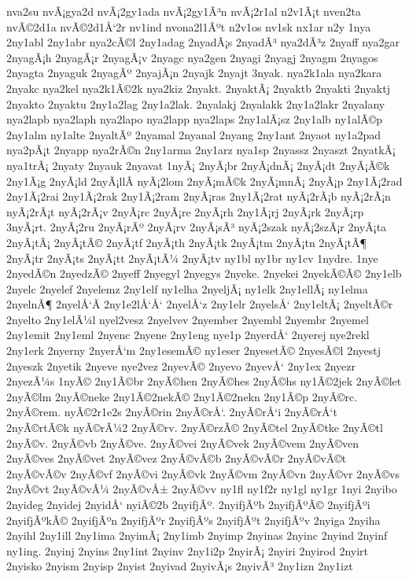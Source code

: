 {nva2su
nvÃ¡gya2d
nvÃ¡2gy1ada
nvÃ¡2gy1Ã³n
nvÃ¡2r1al
n2v1Ã¡t
nven2ta
nvÃ©2d1a
nvÃ©2d1Å‘2r
nv1ind
nvona2l1Ãºt
n2v1os
nv1sk
nx1ar
n2y
1nya
2ny1abl
2ny1abr
nya2cÃ©l
2ny1adag
2nyadÃ¡s
2nyadÃ³
nya2dÃ³z
2nyaff
nya2gar
2nyagÃ¡h
2nyagÃ¡r
2nyagÃ¡v
2nyagc
nya2gen
2nyagi
2nyagj
2nyagm
2nyagos
2nyagta
2nyaguk
2nyagÃº
2nyajÃ¡n
2nyajk
2nyajt
3nyak.
nya2k1ala
nya2kara
2nyakc
nya2kel
nya2k1Ã©2k
nya2kiz
2nyakt.
2nyaktÃ¡
2nyaktb
2nyakti
2nyaktj
2nyakto
2nyaktu
2ny1a2lag
2ny1a2lak.
2nyalakj
2nyalakk
2ny1a2lakr
2nyalany
nya2lapb
nya2laph
nya2lapo
nya2lapp
nya2laps
2ny1alÃ¡sz
2ny1alb
ny1alÃ©p
2ny1alm
ny1alte
2nyaltÃº
2nyamal
2nyanal
2nyang
2ny1ant
2nyaot
ny1a2pad
nya2pÃ¡t
2nyapp
nya2rÃ©n
2ny1arma
2ny1arz
nya1sp
2nyassz
2nyaszt
2nyatkÃ¡
nya1trÃ¡
2nyaty
2nyauk
2nyavat
1nyÃ¡
2nyÃ¡br
2nyÃ¡dnÃ¡
2nyÃ¡dt
2nyÃ¡Ã©k
2ny1Ã¡g
2nyÃ¡ld
2nyÃ¡llÃ­
nyÃ¡2lom
2nyÃ¡mÃ©k
2nyÃ¡mnÃ¡
2nyÃ¡p
2ny1Ã¡2rad
2ny1Ã¡2rai
2ny1Ã¡2rak
2ny1Ã¡2ram
2nyÃ¡ras
2ny1Ã¡2rat
nyÃ¡2rÃ¡b
nyÃ¡2rÃ¡n
nyÃ¡2rÃ¡t
nyÃ¡2rÃ¡v
2nyÃ¡rc
2nyÃ¡re
2nyÃ¡rh
2ny1Ã¡rj
2nyÃ¡rk
2nyÃ¡rp
3nyÃ¡rt.
2nyÃ¡2ru
2nyÃ¡rÃº
2nyÃ¡rv
2nyÃ¡sÃ³
nyÃ¡2szak
nyÃ¡2szÃ¡r
2nyÃ¡ta
2nyÃ¡tÃ¡
2nyÃ¡tÃ©
2nyÃ¡tf
2nyÃ¡th
2nyÃ¡tk
2nyÃ¡tm
2nyÃ¡tn
2nyÃ¡tÃ¶
2nyÃ¡tr
2nyÃ¡ts
2nyÃ¡tt
2nyÃ¡tÃ¼
2nyÃ¡tv
ny1bl
ny1br
ny1cv
1nydre.
1nye
2nyedÃ©n
2nyedzÃ©
2nyeff
2nyegyl
2nyegys
2nyeke.
2nyekei
2nyekÃ©Ã©
2ny1elb
2nyelc
2nyelef
2nyelemz
2ny1elf
ny1elha
2nyeljÃ¡
ny1elk
2ny1ellÃ¡
ny1elma
2nyelnÃ¶
2nyelÅ‘Ã­
2ny1e2lÅ‘Å‘
2nyelÅ‘z
2ny1elr
2nyelsÅ‘
2ny1eltÃ¡
2nyeltÃ©r
2nyelto
2ny1elÃ¼l
nyel2vesz
2nyelvev
2nyember
2nyembl
2nyembr
2nyemel
2ny1emit
2ny1eml
2nyenc
2nyene
2ny1eng
nye1p
2nyerdÅ‘
2nyerej
nye2rekl
2ny1erk
2nyerny
2nyerÅ‘m
2ny1esemÃ©
ny1eser
2nyesetÃ©
2nyesÃ©l
2nyestj
2nyeszk
2nyetik
2nyeve
nye2vez
2nyevÃ©
2nyevo
2nyevÅ‘
2ny1ex
2nyezr
2nyezÃ¼s
1nyÃ©
2ny1Ã©br
2nyÃ©hen
2nyÃ©hes
2nyÃ©hs
ny1Ã©2jek
2nyÃ©let
2nyÃ©lm
2nyÃ©neke
2ny1Ã©2nekÃ©
2ny1Ã©2nekn
2ny1Ã©p
2nyÃ©rc.
2nyÃ©rem.
nyÃ©2r1e2s
2nyÃ©rin
2nyÃ©rÅ‘.
2nyÃ©rÅ‘i
2nyÃ©rÅ‘t
2nyÃ©rtÃ©k
nyÃ©rÃ¼2
2nyÃ©rv.
2nyÃ©rzÃ©
2nyÃ©tel
2nyÃ©tke
2nyÃ©tl
2nyÃ©v.
2nyÃ©vb
2nyÃ©ve.
2nyÃ©vei
2nyÃ©vek
2nyÃ©vem
2nyÃ©ven
2nyÃ©ves
2nyÃ©vet
2nyÃ©vez
2nyÃ©vÃ©b
2nyÃ©vÃ©r
2nyÃ©vÃ©t
2nyÃ©vÃ©v
2nyÃ©vf
2nyÃ©vi
2nyÃ©vk
2nyÃ©vm
2nyÃ©vn
2nyÃ©vr
2nyÃ©vs
2nyÃ©vt
2nyÃ©vÃ¼
2nyÃ©vÅ±
2nyÃ©vv
ny1fl
ny1f2r
ny1gl
ny1gr
1nyi
2nyibo
2nyideg
2nyidej
2nyidÅ‘
nyiÃ©2b
2nyifjÃº.
2nyifjÃºb
2nyifjÃºÃ©
2nyifjÃºi
2nyifjÃºkÃ©
2nyifjÃºn
2nyifjÃºr
2nyifjÃºs
2nyifjÃºt
2nyifjÃºv
2nyiga
2nyiha
2nyihl
2ny1ill
2ny1ima
2nyimÃ¡
2ny1imb
2nyimp
2nyinas
2nyinc
2nyind
2nyinf
ny1ing.
2nyinj
2nyins
2ny1int
2nyinv
2ny1i2p
2nyirÃ¡
2nyiri
2nyirod
2nyirt
2nyisko
2nyism
2nyisp
2nyist
2nyivad
2nyivÃ¡s
2nyivÃ³
2ny1izn
2ny1izt
}
